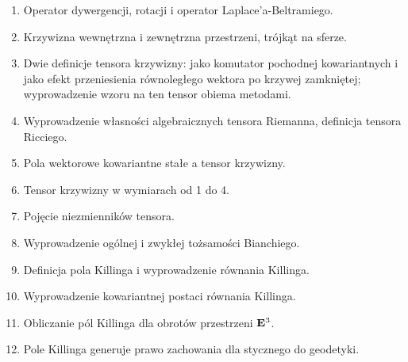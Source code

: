 \documentclass[a4paper,11pt]{article}
\begin{document}
\begin{enumerate}
\item Operator dywergencji, rotacji i operator Laplace’a-Beltramiego.

\item Krzywizna wewnętrzna i zewnętrzna przestrzeni, trójkąt na
  sferze.

\item Dwie definicje tensora krzywizny: jako komutator pochodnej
  kowariantnych i jako efekt przeniesienia równoległego wektora po
  krzywej zamkniętej; wyprowadzenie wzoru na ten tensor obiema
  metodami.

\item Wyprowadzenie własności algebraicznych tensora Riemanna,
  definicja tensora Ricciego.

\item Pola wektorowe kowariantne stałe a tensor krzywizny.

\item Tensor krzywizny w wymiarach od 1 do 4.

\item Pojęcie niezmienników tensora.

\item Wyprowadzenie ogólnej i zwykłej tożsamości Bianchiego.

\item Definicja pola Killinga i wyprowadzenie równania Killinga.

\item Wyprowadzenie kowariantnej postaci równania Killinga.

\item Obliczanie pól Killinga dla obrotów przestrzeni $\mathbf{E}^{ 3 }$.

\item Pole Killinga generuje prawo zachowania dla stycznego do
  geodetyki.










\end{enumerate}
\end{document}
